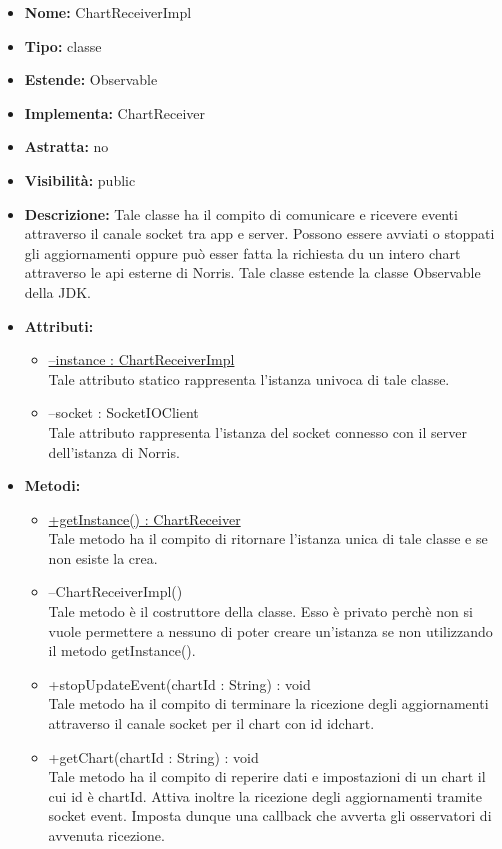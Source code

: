			
			\begin{itemize}
			\item \textbf{Nome:} ChartReceiverImpl
			\item \textbf{Tipo:} classe
			
		\item \textbf{Estende:}
		Observable
		\item \textbf{Implementa:}
		ChartReceiver
		\item \textbf{Astratta:}
		no
			\item \textbf{Visibilità:} public
			\item \textbf{Descrizione:} Tale classe ha il compito di comunicare e ricevere eventi attraverso il canale socket tra app e server. Possono essere avviati o stoppati gli aggiornamenti oppure può esser fatta la richiesta du un intero chart attraverso le api esterne di Norris. Tale classe estende la classe Observable della JDK.
			\item \textbf{Attributi:}
				\begin{itemize}
				\setlength{\itemsep}{5pt}
				
					\item[\ding{111}] \underline{--instance : ChartReceiverImpl} \\ [1mm] Tale attributo statico rappresenta l'istanza univoca di tale classe.
					\item[\ding{111}] {--socket : SocketIOClient} \\ [1mm] Tale attributo rappresenta l'istanza del socket connesso con il server dell'istanza di Norris.
				\end{itemize}
		
			\item \textbf{Metodi:}
				\begin{itemize}
				\setlength{\itemsep}{5pt}
				
					\item[\ding{111}] {\underline{+getInstance() : ChartReceiver}} \\ [1mm] Tale metodo ha il compito di ritornare l'istanza unica di tale classe e se non esiste la crea.
					\item[\ding{111}] {{--ChartReceiverImpl()}} \\ [1mm] Tale metodo è il costruttore della classe. Esso è privato perchè non si vuole permettere a nessuno di poter creare un'istanza se non utilizzando il metodo getInstance().
					\item[\ding{111}] {{+stopUpdateEvent(chartId : String) : void}} \\ [1mm] Tale metodo ha il compito di terminare la ricezione degli aggiornamenti attraverso il canale socket per il chart con id idchart.
					\item[\ding{111}] {{+getChart(chartId : String) : void}} \\ [1mm] Tale metodo ha il compito di reperire dati e impostazioni di un chart il cui id è chartId. Attiva inoltre la ricezione degli aggiornamenti tramite socket event. Imposta dunque una callback che avverta gli osservatori di avvenuta ricezione.
				\end{itemize}
		
			\end{itemize}

